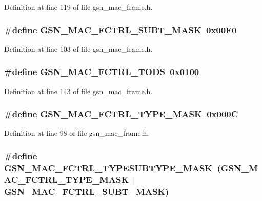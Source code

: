 Definition at line 119 of file gsn\_\-mac\_\-frame.h.

\hypertarget{a00523_ada6cd8fc7ec5a97a67240ea3670c7d82}{
\subsubsection[{GSN\_\-MAC\_\-FCTRL\_\-SUBT\_\-MASK}]{\setlength{\rightskip}{0pt plus 5cm}\#define GSN\_\-MAC\_\-FCTRL\_\-SUBT\_\-MASK~0x00F0}}
\label{a00523_ada6cd8fc7ec5a97a67240ea3670c7d82}


Definition at line 103 of file gsn\_\-mac\_\-frame.h.

\hypertarget{a00523_a582ea450f88453cf5a4837c2c0a2f2fa}{
\subsubsection[{GSN\_\-MAC\_\-FCTRL\_\-TODS}]{\setlength{\rightskip}{0pt plus 5cm}\#define GSN\_\-MAC\_\-FCTRL\_\-TODS~0x0100}}
\label{a00523_a582ea450f88453cf5a4837c2c0a2f2fa}


Definition at line 143 of file gsn\_\-mac\_\-frame.h.

\hypertarget{a00523_acf97b27529a28ee5a6ba9884c8d9c474}{
\subsubsection[{GSN\_\-MAC\_\-FCTRL\_\-TYPE\_\-MASK}]{\setlength{\rightskip}{0pt plus 5cm}\#define GSN\_\-MAC\_\-FCTRL\_\-TYPE\_\-MASK~0x000C}}
\label{a00523_acf97b27529a28ee5a6ba9884c8d9c474}


Definition at line 98 of file gsn\_\-mac\_\-frame.h.

\hypertarget{a00523_a22c7c71904dd6b601df39aef9e639aac}{
\subsubsection[{GSN\_\-MAC\_\-FCTRL\_\-TYPESUBTYPE\_\-MASK}]{\setlength{\rightskip}{0pt plus 5cm}\#define GSN\_\-MAC\_\-FCTRL\_\-TYPESUBTYPE\_\-MASK~(GSN\_\-MAC\_\-FCTRL\_\-TYPE\_\-MASK $|$ GSN\_\-MAC\_\-FCTRL\_\-SUBT\_\-MASK)}}
\label{a00523_a22c7c71904dd6b601df39aef9e639aac}


